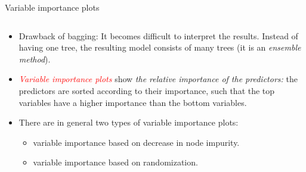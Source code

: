 \documentclass[10pt,ignorenonframetext,]{beamer}
\providecommand{\tightlist}{%
  \setlength{\itemsep}{0pt}\setlength{\parskip}{0pt}}
\begin{document}
\begin{frame}

\begin{block}{Variable importance plots}

\(~\)

\begin{itemize}
\tightlist
\item
  Drawback of bagging: It becomes difficult to interpret the results.
  Instead of having one tree, the resulting model consists of many trees
  (it is an \emph{ensemble method}).
\end{itemize}

\vspace{2mm}

\begin{itemize}
\tightlist
\item
  \emph{\textcolor{red}{Variable importance plots}} show \emph{the
  relative importance of the predictors:} the predictors are sorted
  according to their importance, such that the top variables have a
  higher importance than the bottom variables.
\end{itemize}

\vspace{2mm}

\begin{itemize}
\item
  There are in general two types of variable importance plots:

  \begin{itemize}
  \tightlist
  \item
    variable importance based on decrease in node impurity.
  \item
    variable importance based on randomization.
  \end{itemize}
\end{itemize}

\end{block}

\end{frame}
\end{document}
